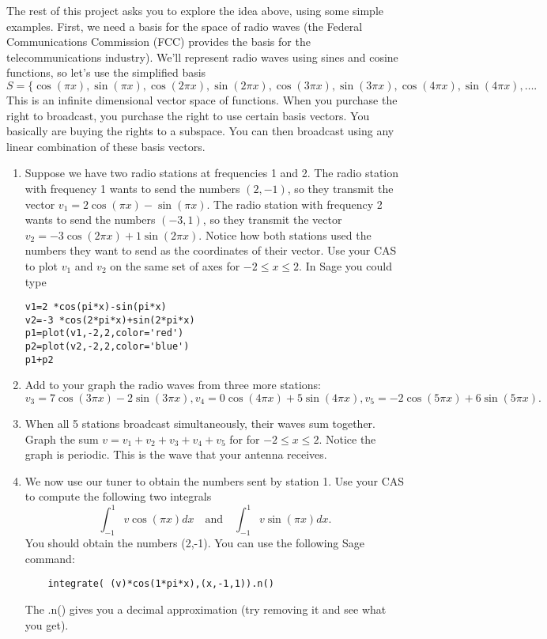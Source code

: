 \begin{enumerate}
The rest of this project asks you to explore the idea above, using some simple examples. 
First, we need a basis for the space of radio waves (the Federal Communications Commission (FCC) provides the basis for the telecommunications industry).  
We'll represent radio waves using sines and cosine functions, so let's use the simplified basis 
$$S=\{\cos(\pi x),\sin(\pi x),\cos(2\pi x),\sin(2\pi x),\cos(3\pi x),\sin(3\pi x),\cos(4\pi x),\sin(4\pi x),\ldots.$$
This is an infinite dimensional vector space of functions. When you purchase the right to broadcast, you purchase the right to use certain basis vectors. You basically are buying the rights to a subspace. You can then broadcast using any linear combination of these basis vectors.
\begin{enumerate}
	\item Suppose we have two radio stations at frequencies 1 and 2. 
	The radio station with frequency 1 wants to send the numbers $(2,-1)$, so they transmit the vector $v_1 = 2\cos(\pi x)-\sin(\pi x)$. 	
	The radio station with frequency 2 wants to send the numbers $(-3,1)$, so they transmit the vector $v_2 = -3\cos(2\pi x)+1\sin(2\pi x)$. Notice how both stations used the numbers they want to send as the coordinates of their vector.
	Use your CAS to plot $v_1$ and $v_2$ on the same set of axes for $-2\leq x\leq 2$. In Sage you could type 
	\begin{verbatim}
v1=2 *cos(pi*x)-sin(pi*x)
v2=-3 *cos(2*pi*x)+sin(2*pi*x)
p1=plot(v1,-2,2,color='red')
p2=plot(v2,-2,2,color='blue')
p1+p2
	\end{verbatim}
	
	\item 
	Add to your graph the radio waves from three more stations:
	$$v_3 = 7\cos(3\pi x)-2\sin(3\pi x), v_4 = 0\cos(4\pi x)+5\sin(4\pi x),v_5 = -2\cos(5\pi x)+6\sin(5\pi x).$$
	
	\item 
	When all 5 stations broadcast simultaneously, their waves sum together.  Graph the sum $v = v_1+v_2+v_3+v_4+v_5$ for for $-2\leq x\leq 2$. Notice the graph is periodic. This is the wave that your antenna receives.
	
	\item We now use our tuner to obtain the numbers sent by station 1. Use your CAS to compute the following two integrals
	$$ \int_{-1}^1 v \cos(\pi x) dx \quad \text{and}\quad \int_{-1}^1 v \sin(\pi x) dx .$$
	You should obtain the numbers (2,-1).  You can use the following Sage command:
	\begin{verbatim}
	integrate( (v)*cos(1*pi*x),(x,-1,1)).n()
	\end{verbatim}
	The .n() gives you a decimal approximation (try removing it and see what you get).


\end{enumerate}
\end{enumerate}

